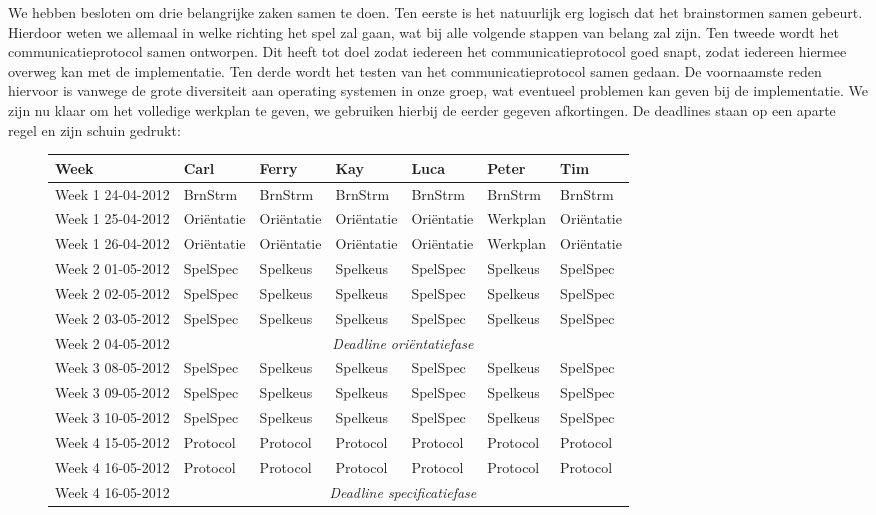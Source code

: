 \documentclass[a4paper,11pt, twoside]{article}
\newcommand{\BS}{BrnStrm}
\newcommand{\ON}{Ori\"entatie}
\newcommand{\MW}{Werkplan}
\newcommand{\MS}{SpelSpec}
\newcommand{\MA}{Spelkeus}
\newcommand{\OC}{Protocol}
\begin{document}
    We hebben besloten om drie belangrijke zaken samen te doen. Ten eerste is het natuurlijk erg logisch dat het brainstormen samen gebeurt. Hierdoor weten we allemaal in welke richting het spel zal gaan, wat bij alle volgende stappen van belang zal zijn. Ten tweede wordt het communicatieprotocol samen ontworpen. Dit heeft tot doel zodat iedereen het communicatieprotocol goed snapt, zodat iedereen hiermee overweg kan met de implementatie. Ten derde wordt het testen van het communicatieprotocol samen gedaan. De voornaamste reden hiervoor is vanwege de grote diversiteit aan operating systemen in onze groep, wat eventueel problemen kan geven bij de implementatie. We zijn nu klaar om het volledige werkplan te geven, we gebruiken hierbij de eerder gegeven afkortingen. De deadlines staan op een aparte regel en zijn schuin gedrukt:
    \begin{figure}[H]
        \small
        \centering
        \begin{tabular}{| l | l | l | l | l | l | l |}
        \hline
        Week & Carl & Ferry & Kay & Luca & Peter & Tim \\ \hline
        Week 1 24-04-2012 & \BS & \BS & \BS & \BS & \BS & \BS \\ \hline
        Week 1 25-04-2012 & \ON & \ON & \ON & \ON & \MW & \ON \\ \hline
        Week 1 26-04-2012 & \ON & \ON & \ON & \ON & \MW & \ON \\ \hline
        Week 2 01-05-2012 & \MS & \MA & \MA & \MS & \MA & \MS \\ \hline
        Week 2 02-05-2012 & \MS & \MA & \MA & \MS & \MA & \MS \\ \hline
        Week 2 03-05-2012 & \MS & \MA & \MA & \MS & \MA & \MS \\ \hline
        Week 2 04-05-2012 & \multicolumn{6}{|c|}{\emph{Deadline ori\"entatiefase}} \\ \hline
        Week 3 08-05-2012 & \MS & \MA & \MA & \MS & \MA & \MS \\ \hline
        Week 3 09-05-2012 & \MS & \MA & \MA & \MS & \MA & \MS \\ \hline
        Week 3 10-05-2012 & \MS & \MA & \MA & \MS & \MA & \MS \\ \hline
        Week 4 15-05-2012 & \OC & \OC & \OC & \OC & \OC & \OC \\ \hline
        Week 4 16-05-2012 & \OC & \OC & \OC & \OC & \OC & \OC \\ \hline
        Week 4 16-05-2012 & \multicolumn{6}{|c|}{\emph{Deadline specificatiefase}} \\ \hline

\end{tabular}
\end{figure}
\end{document}
